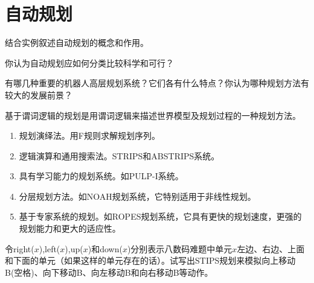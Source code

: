 \chapter{自动规划}

\begin{question}
结合实例叙述自动规划的概念和作用。
\end{question}
\begin{solution}
\end{solution}

\begin{question}
你认为自动规划应如何分类比较科学和可行？
\end{question}
\begin{solution}
\end{solution}

\begin{question}
有哪几种重要的机器人高层规划系统？它们各有什么特点？你认为哪种规划方法有较大的发展前景？
\end{question}
\begin{solution}
基于谓词逻辑的规划是用谓词逻辑来描述世界模型及规划过程的一种规划方法。
	\begin{enumerate}
	\item 规划演绎法。用F规则求解规划序列。 
	\item 逻辑演算和通用搜索法。STRIPS和ABSTRIPS系统。
	\item 具有学习能力的规划系统。如PULP-I系统。
	\item 分层规划方法。如NOAH规划系统，它特别适用于非线性规划。
	\item 基于专家系统的规划。如ROPES规划系统，它具有更快的规划速度，更强的规划能力和更大的适应性。
	\end{enumerate}  
\end{solution}

\begin{question}
令right($x$),left($x$),up($x$)和down($x$)分别表示八数码难题中单元$x$左边、右边、上面和下面的单元（如果这样的单元存在的话）。试写出STIPS规划来模拟向上移动B(空格)、向下移动B、向左移动B和向右移动B等动作。
\end{question}
\begin{solution}
\end{solution}

